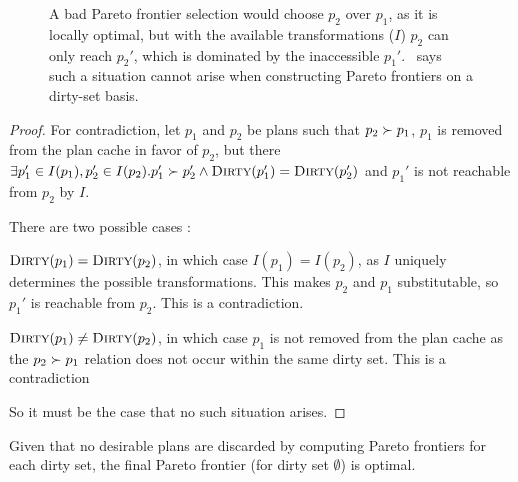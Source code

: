 \begin{figure}
\centering
{}
\caption{A bad Pareto frontier selection would choose $p_2$ over $p_1$, as it is locally optimal, but with the available transformations ($I$) $p_2$  can only reach $p_2'$, which is dominated by the inaccessible $p_1'$.~ says such a situation cannot arise when constructing Pareto frontiers on a dirty-set basis.}
\label{fig:bad-sit-diagram}
\end{figure}

\begin{proof}
For contradiction, let $p_1$ and $p_2$ be plans such that $p_2 \succ p_1$, $p_1$ is removed from the plan cache
in favor of $p_2$, but there  $\exists p_1' \in I(p_1), p_2' \in I(p_2). p_1' \succ p_2' \land \textsc{Dirty}(p_1') = \textsc{Dirty}(p_2')$
and $p_1'$ is not reachable from $p_2$ by $I$.

There are two possible cases :

\begin{case}
$\textsc{Dirty}(p_1) = \textsc{Dirty}(p_2)$, in which case $I(p_1) = I(p_2)$, as $I$ uniquely determines the possible transformations. This makes $p_2$ and $p_1$ substitutable, so $p_1'$ is reachable from $p_2$. This is a contradiction.
\end{case}

\begin{case}
$\textsc{Dirty}(p_1) \not= \textsc{Dirty}(p_2)$, in which case $p_1$ is not removed from the plan cache as the $p_2 \succ p_1$ relation does not occur within the same dirty set. This is a contradiction
\end{case}

So it must be the case that no such situation arises.
\end{proof}


Given that no desirable plans are discarded by computing Pareto frontiers for each dirty set, the final Pareto frontier (for dirty set $\emptyset$) is optimal.

